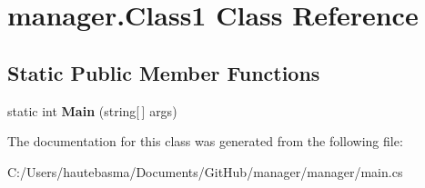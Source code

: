 \hypertarget{classmanager_1_1_class1}{}\section{manager.\+Class1 Class Reference}
\label{classmanager_1_1_class1}
\subsection*{Static Public Member Functions}
\begin{DoxyCompactItemize}
\item 
\mbox{\label{classmanager_1_1_class1_a99820fa24751d7baf1e425ad3bbcf349}} 
static int {\bfseries Main} (string\mbox{[}$\,$\mbox{]} args)
\end{DoxyCompactItemize}


The documentation for this class was generated from the following file\+:\begin{DoxyCompactItemize}
\item 
C\+:/\+Users/hautebasma/\+Documents/\+Git\+Hub/manager/manager/main.\+cs\end{DoxyCompactItemize}
